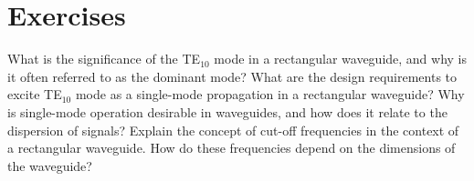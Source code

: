 \section*{Exercises}
\begin{ExerciseList}
\Exercise[label={ex391}] 
What is the significance of the TE$_{10}$ mode in a rectangular waveguide, and why is it often referred to as the dominant mode?
\Exercise[label={ex392}]
What are the design requirements to excite TE$_10$ mode as a single-mode propagation
in a rectangular waveguide?
\Exercise[label={ex393}]
Why is single-mode operation desirable in waveguides, and how does it relate to the dispersion of signals?
\Exercise[label={ex394}]
Explain the concept of cut-off frequencies in the context of a rectangular waveguide. How do these frequencies depend on the dimensions of the waveguide?
\end{ExerciseList}
